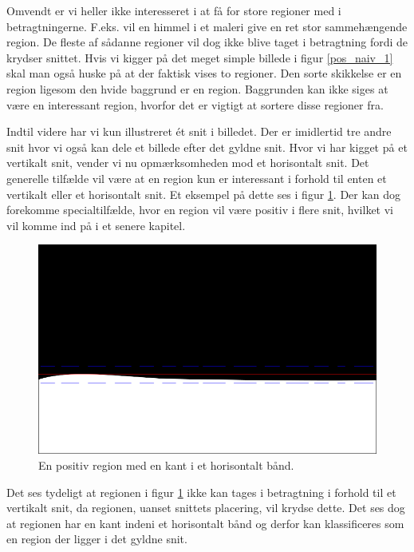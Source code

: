 {Omvendt er vi heller ikke interesseret i at få for store regioner med i
betragtningerne. F.eks. vil en himmel i et maleri give en ret stor
sammehængende region. De fleste af sådanne regioner vil dog ikke blive
taget i betragtning fordi de krydser snittet. Hvis vi kigger på det
meget simple billede i figur \ref{pos_naiv_1} skal man også huske på at
der faktisk vises to regioner. Den sorte skikkelse er en region ligesom
den hvide baggrund er en region.  Baggrunden kan ikke siges at være en
interessant region, hvorfor det er vigtigt at sortere disse regioner
fra.

Indtil videre har vi kun illustreret ét snit i billedet. Der er
imidlertid tre andre snit hvor vi også kan dele et billede efter det
gyldne snit. Hvor vi har kigget på et vertikalt snit, vender vi nu
opmærksomheden mod et horisontalt snit. Det generelle tilfælde vil være
at en region kun er interessant i forhold til enten et vertikalt eller
et horisontalt snit. Et eksempel på dette ses i figur
\ref{pos_horiz_naiv_margin_1}. Der kan dog forekomme specialtilfælde,
hvor en region vil være positiv i flere snit, hvilket vi vil komme ind
på i et senere kapitel.
\begin{figure}[H]
	\begin{center}
		\includegraphics[scale=\imgscale,angle=0]{afsnit/vores_implementation/billeder/naiv_algoritme/naiv_horiz_positiv_blob_1}
	\end{center}
	\caption[Positiv horisontal region]{En positiv region med en
	kant i et horisontalt bånd.}
	\label{pos_horiz_naiv_margin_1}
\end{figure}
Det ses tydeligt at regionen i figur \ref{pos_horiz_naiv_margin_1} ikke
kan tages i betragtning i forhold til et vertikalt snit, da regionen,
uanset snittets placering, vil krydse dette. Det ses dog at regionen har
en kant indeni et horisontalt bånd og derfor kan klassificeres som en
region der ligger i det gyldne snit.

}
